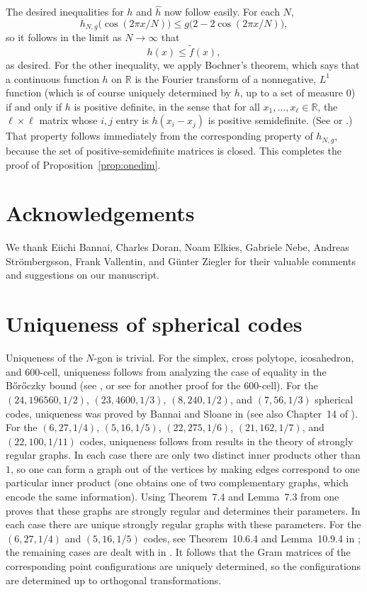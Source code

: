 \documentclass{jams-l}
\theoremstyle{plain}
\numberwithin{theorem}{section}
\theoremstyle{definition}
\numberwithin{equation}{section}
\newcommand{\R}{{\mathbb R}}
\newcommand{\ft}{\widetilde{f}}
\begin{document}
The desired inequalities for $h$ and $\widehat{h}$ now follow
easily.  For each $N$,
$$
h_{N,g}\big(\cos (2\pi x/N)\big) \le g\big(2 - 2\cos (2\pi
x/N)\big),
$$
so it follows in the limit as $N \to \infty$ that
$$
h(x) \le \ft(x),
$$
as desired.  For the other inequality, we apply Bochner's theorem,
which says that a continuous function $h$ on $\R$ is the Fourier
transform of a nonnegative, $L^1$ function (which is of course
uniquely determined by $h$, up to a set of measure $0$) if and
only if $h$ is positive definite, in the sense that for all
$x_1,\dots,x_\ell \in \R$, the $\ell \times \ell$ matrix whose
$i,j$ entry is $h(x_i-x_j)$ is positive semidefinite. (See
\cite[p.~124]{St} or \cite[p.~303]{R}.)  That property follows
immediately from the corresponding property of $h_{N,g}$, because
the set of positive-semidefinite matrices is closed.  This
completes the proof of Proposition~\ref{prop:onedim}.

\section*{Acknowledgements}

We thank Eiichi Bannai, Charles Doran, Noam Elkies, Gabriele Nebe,
Andreas Str\"ombergsson, Frank Vallentin, and G\"unter Ziegler for
their valuable comments and suggestions on our manuscript.

\appendix
\section{Uniqueness of spherical codes}
\label{app}

Uniqueness of the $N$-gon is trivial.  For the simplex, cross
polytope, icosahedron, and $600$-cell, uniqueness follows from
analyzing the case of equality in the B\H or\H oczky bound (see
\cite[p.~260]{B}, or see \cite{BD} for another proof for the
$600$-cell). For the $(24,196560,1/2)$, $(23,4600,1/3)$,
$(8,240,1/2)$, and $(7,56,1/3)$ spherical codes, uniqueness was
proved by Bannai and Sloane in \cite{BS} (see also Chapter~14 of
\cite{CS}).  For the $(6,27,1/4)$, $(5,16,1/5)$, $(22,275,1/6)$,
$(21,162,1/7)$, and $(22,100,1/11)$ codes, uniqueness follows from
results in the theory of strongly regular graphs.  In each case
there are only two distinct inner products other than $1$, so one
can form a graph out of the vertices by making edges correspond to
one particular inner product (one obtains one of two complementary
graphs, which encode the same information).  Using Theorem~7.4 and
Lemma~7.3 from \cite{DGS} one proves that these graphs are
strongly regular and determines their parameters. In each case
there are unique strongly regular graphs with these parameters.
For the $(6,27,1/4)$ and $(5,16,1/5)$ codes, see Theorem~10.6.4
and Lemma~10.9.4 in \cite{GR};  the remaining cases are dealt with
in \cite{CGS}.  It follows that the Gram matrices of the
corresponding point configurations are uniquely determined, so the
configurations are determined up to orthogonal transformations.
\end{document}
